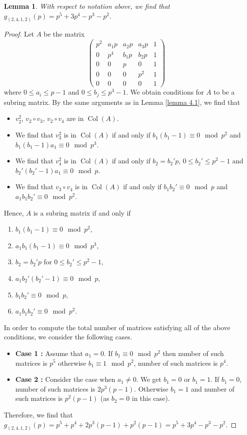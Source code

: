 \documentclass[a4paper]{amsart}
\newtheorem{lemma}[theorem]{Lemma}
\numberwithin{equation}{section}
\theoremstyle{remark}
\newcommand{\op}[1]{\operatorname{#1}}
\begin{document}
\begin{lemma}\label{lemma 4.2}
With respect to notation above, we find that $g_{(2,4,1,2)}(p) = p^5 + 3p^4 - p^3 - p^2$.
\end{lemma}
\begin{proof} 
Let $A$ be the matrix
$$\begin{pmatrix}p^2 & a_1p & a_2p & a_3p & 1\\ 0 & p^4 & b_1p & b_2p & 1\\
0 & 0 & p & 0 & 1\\
0 & 0 & 0 & p^2 & 1\\
0 & 0 & 0 & 0 & 1\end{pmatrix}$$
where $0 \leq a_i \leq p-1$ and $0 \leq b_j \leq p^3-1$.
We obtain conditions for $A$ to be a subring matrix. By the same arguments as in Lemma \ref{lemma 4.1}, we find that
\begin{itemize}
    \item $v_2^2$, $v_2\circ v_3$, $v_2\circ v_4$ are in $\op{Col}(A)$.
    \item We find that $v_3^2$ is in $\op{Col}(A)$ if and only if $b_1(b_1-1) \equiv 0 \mod p^2$ and $b_1(b_1-1)a_1 \equiv 0 \mod p^3$.
    \item We find that $v_4^2$ is in $\op{Col}(A)$ if and only if
    $b_2 = b_2'p$, $0 \leq b_2' \leq p^2-1$ and $b_2'(b_2'-1)a_1 \equiv 0 \mod p$.
    \item We find that $v_3\circ v_4$ is in $\op{Col}(A)$ if and only if $b_1b_2' \equiv 0 \mod p$ and $a_1b_1b_2' \equiv 0 \mod p^2$.
\end{itemize}
Hence, $A$ is a subring matrix if and only if
\begin{enumerate}
    \item $b_1(b_1-1) \equiv 0 \mod p^2$,
    \item $a_1b_1(b_1-1) \equiv 0 \mod p^3$,
    \item $b_2 = b_2'p$ for $0 \leq b_2' \leq p^2-1$,
    \item $a_1b_2'(b_2'-1) \equiv 0 \mod p$,
    \item $b_1b_2' \equiv 0 \mod p$,
    \item $a_1b_1b_2' \equiv 0 \mod p^2$.
\end{enumerate}
In order to compute the total number of matrices satisfying all of the above conditions, we consider the following cases.
\begin{itemize}
    \item \textbf{Case 1 :} Assume that $a_1 = 0$. If $b_1 \equiv 0 \mod p^2$ then number of such matrices is $p^5$ otherwise $b_1 \equiv 1 \mod p^2$, number of such matrices is $p^4$.
    \item \textbf{Case 2 :} Consider the case when $a_1 \neq 0$. We get $b_1 = 0$ or $b_1 = 1$. If $b_1 = 0$, number of such matrices is $2p^3(p-1)$. Otherwise $b_1 = 1$ and number of such matrices is $p^2(p-1)$ (as $b_2 = 0$ in this case).
\end{itemize}
Therefore, we find that $g_{(2,4,1,2)}(p) = p^5+p^4+2p^3(p-1)+p^2(p-1)= p^5 + 3p^4 - p^3 - p^2$.
\end{proof}
\end{document}

